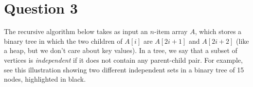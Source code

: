 
\section*{Question 3}

The recursive algorithm below takes as input an $n$-item array $A$, which stores a binary tree in which the two children of $A[i]$ are $A[2i+1]$ and $A[2i+2]$ (like a heap, but we don't care about key values). In a tree, we say that a subset of vertices is \textit{independent} if it does not contain any parent-child pair. For example, see this illustration showing two different independent sets in a binary tree of 15 nodes, highlighted in black.

